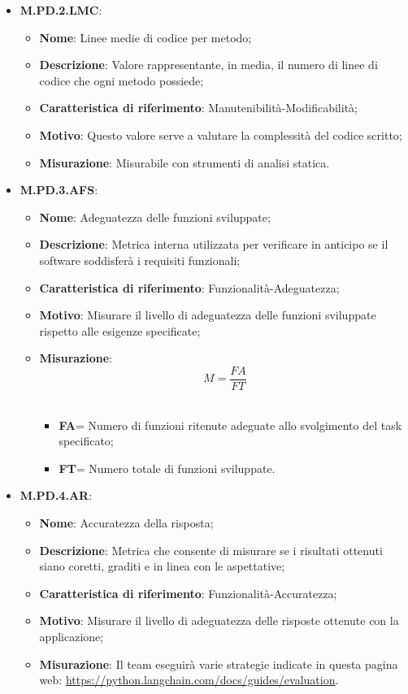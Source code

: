 \documentclass[10pt, a4paper]{article}
\begin{document}
\begin{itemize}
 \item \textbf{M.PD.2.LMC}:
    \begin{itemize}
        \item \textbf{Nome}: Linee medie di codice per metodo;
        \item \textbf{Descrizione}: Valore rappresentante, in media, il numero di linee di codice che ogni metodo possiede;
        \item \textbf{Caratteristica di riferimento}: Manutenibilità-Modificabilità;
        \item \textbf{Motivo}: Questo valore serve a valutare la complessità del codice scritto; 
       \item \textbf{Misurazione}: Misurabile con strumenti di analisi statica. \\
    \end{itemize}

     \item \textbf{M.PD.3.AFS}:
    \begin{itemize}
        \item \textbf{Nome}: Adeguatezza delle funzioni sviluppate;
        \item \textbf{Descrizione}: Metrica interna utilizzata per verificare in anticipo se il software soddisferà i requisiti funzionali;
        \item \textbf{Caratteristica di riferimento}: Funzionalità-Adeguatezza;
        \item \textbf{Motivo}: Misurare il livello di adeguatezza delle funzioni sviluppate rispetto alle esigenze specificate; 
       \item \textbf{Misurazione}:   \[ M=\frac{FA}{FT} \] \\
       \begin{itemize}
           \item \textbf{FA}= Numero di funzioni ritenute adeguate allo svolgimento del task specificato;
           \item \textbf{FT}= Numero totale di funzioni sviluppate.\\
       \end{itemize}
    \end{itemize}

  \item \textbf{M.PD.4.AR}:
    \begin{itemize}
        \item \textbf{Nome}: Accuratezza della risposta;
        \item \textbf{Descrizione}: Metrica che consente di misurare se i risultati ottenuti siano coretti, graditi e in linea con le aspettative;
        \item \textbf{Caratteristica di riferimento}: Funzionalità-Accuratezza;
        \item \textbf{Motivo}: Misurare il livello di adeguatezza delle risposte ottenute con la applicazione; 
       \item \textbf{Misurazione}: Il team eseguirà varie strategie indicate in questa pagina web: \url{https://python.langchain.com/docs/guides/evaluation}. \\
       

\end{itemize}
\end{itemize}
\end{document}
